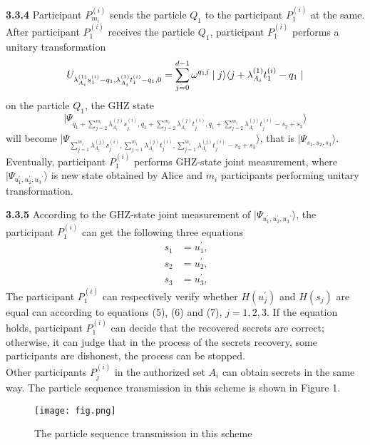 \documentclass[pdflatex,sn-mathphys]{sn-jnl}%
\theoremstyle{thmstyleone}%
\theoremstyle{thmstyletwo}%
\theoremstyle{thmstylethree}%
\begin{document}
\indent\textbf{3.3.4} Participant $P_{m_i}^{(i)}$ sends the particle $Q_1$ to the participant $P_1^{(i)}$ at the same. After participant $P_1^{(i)}$ receives the particle $Q_1$, participant $P_1^{(i)}$ performs a unitary transformation
\begin{equation}
U_{{\lambda_{A_i}^{(1)}s_1^{(i)}-q_1},{\lambda_{A_i}^{(1)}t_1^{(i)}-q_1},{0}}=\sum_{j=0}^{d-1} \omega^{{q_1}j}\mid{j}\rangle\langle{j+{\lambda_{A_i}^{(1)}t_1^{(i)}-q_1}}\mid\notag
\end{equation}
on the particle $Q_1$, the GHZ state
\[\mid\varPsi_{{q_1}+\sum_{j=2}^{m_i}{\lambda_{A_i}^{(j)}s_j^{(i)}},{q_1}+\sum_{j=2}^{m_i}{\lambda_{A_i}^{(j)}t_j^{(i)}},{q_1}+\sum_{j=2}^{m_i}{\lambda_{A_i}^{(j)}t_j^{(i)}-s_2+s_3}}\rangle\] 
will become
$\mid\varPsi_{\sum_{j=1}^{m_i}{\lambda_{A_i}^{(j)}s_j^{(i)}},\sum_{j=1}^{m_i}{\lambda_{A_i}^{(j)}t_j^{(i)}},\sum_{j=1}^{m_i}{\lambda_{A_i}^{(j)}t_j^{(i)}-s_2+s_3}}\rangle $, that is $\mid\varPsi_{{s_1},{s_2},{s_3}}\rangle$. Eventually, participant $P_1^{(i)}$ performs GHZ-state joint measurement, where $\mid\varPsi_{{u_1^\prime},{u_2^\prime},{u_3}^\prime}\rangle$ is new state obtained by Alice and $m_i$ participants performing unitary transformation.

\indent\textbf{3.3.5} According to the GHZ-state joint measurement of $\mid\varPsi_{{u_1^\prime},{u_2^\prime},{u_3}^\prime}\rangle$, the participant $P_1^{(i)}$ can get the following three equations
\begin{align}
 \ s_1 &=u_1^\prime,\\
 \ s_2 &=u_2^\prime,\\
 \ s_3 &=u_3^\prime,
\end{align}
The participant $P_1^{(i)}$ can respectively verify whether $H(u_j^\prime)$ and $H(s_j)$ are equal can according to equations (5), (6) and (7), $j=1,2,3$. If the equation holds, participant $P_1^{(i)}$ can decide that the recovered secrets are correct; otherwise, it can judge that in the process of the secrets recovery, some participants are dishonest, the process can be stopped.\\
\indent Other participants $P_j^{(i)}$ in the authorized set $A_i$ can obtain secrets in the same way. The particle sequence transmission in this scheme is shown in Figure 1.

\begin{figure}[h]%
\centering
\texttt{[image: fig.png]}
\centering
\caption{The particle sequence transmission in this scheme}\label{fig1}   
\end{figure}
\end{document}
